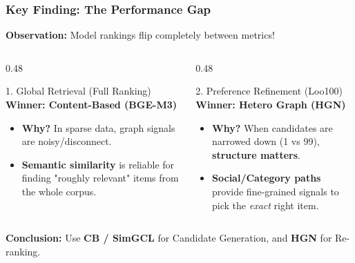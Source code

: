 \documentclass{beamer}
\begin{document}
\begin{frame}
    \frametitle{Key Finding: The Performance Gap}
    \textbf{Observation:} Model rankings flip completely between metrics!

    \vspace{0.2cm}
    \begin{columns}
        \begin{column}{0.48\textwidth}
            \begin{alertblock}{1. Global Retrieval (Full Ranking)}
                \textbf{Winner: Content-Based (BGE-M3)}
                \begin{itemize}
                    \item \textbf{Why?} In sparse data, graph signals are noisy/disconnect.
                    \item \textbf{Semantic similarity} is reliable for finding "roughly relevant" items from the whole corpus.
                \end{itemize}
            \end{alertblock}
        \end{column}

        \begin{column}{0.48\textwidth}
            \begin{exampleblock}{2. Preference Refinement (Loo100)}
                \textbf{Winner: Hetero Graph (HGN)}
                \begin{itemize}
                    \item \textbf{Why?} When candidates are narrowed down (1 vs 99), \textbf{structure matters}.
                    \item \textbf{Social/Category paths} provide fine-grained signals to pick the \textit{exact} right item.
                \end{itemize}
            \end{exampleblock}
        \end{column}
    \end{columns}

    \vspace{0.3cm}
    \centering
    \textbf{Conclusion:} Use \textbf{CB / SimGCL} for Candidate Generation, and \textbf{HGN} for Re-ranking.
\end{frame}
\end{document}
